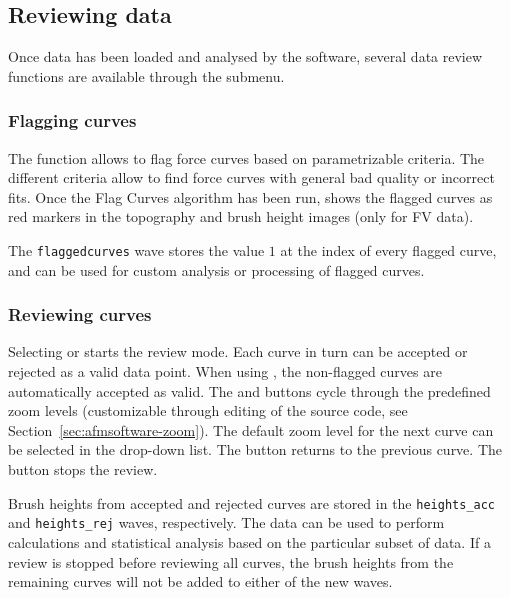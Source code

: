 \documentclass[12pt,a4paper]{article}
\begin{document}
\subsection{Reviewing data}
Once data has been loaded and analysed by the software, several data review functions are available through the  submenu.

\subsubsection{Flagging curves}
The function  allows to flag force curves based on parametrizable criteria. The different criteria allow to find force curves with general bad quality or incorrect fits.
Once the Flag Curves algorithm has been run,  shows the flagged curves as red markers in the topography and brush height images (only for FV data).

The \texttt{flaggedcurves} wave stores the value $1$ at the index of every flagged curve, and can be used for custom analysis or processing of flagged curves.

\subsubsection{Reviewing curves}
Selecting  or  starts the review mode. Each curve in turn can be accepted or rejected as a valid data point.
When using , the non-flagged curves are automatically accepted as valid.
The  and  buttons cycle through the predefined zoom levels (customizable through editing of the source code, see Section~\ref{sec:afmsoftware-zoom}).
The default zoom level for the next curve can be selected in the drop-down list.
The  button returns to the previous curve. The  button stops the review.

Brush heights from accepted and rejected curves are stored in the \texttt{heights\_acc} and \texttt{heights\_rej} waves, respectively. The data can be used to perform calculations and statistical analysis based on the particular subset of data.
If a review is stopped before reviewing all curves, the brush heights from the remaining curves will not be added to either of the new waves.
\end{document}
